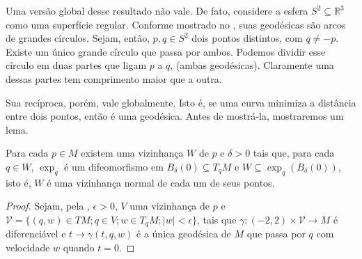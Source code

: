 Uma versão global desse resultado não vale. De fato, considere a esfera $S^{2}\subseteq \mathbb{R}^{3}$ como uma superfície regular. Conforme mostrado no , suas geodésicas são arcos de grandes círculos. Sejam, então, $p,q \in S^{2}$ dois pontos distintos, com $q\neq-p$. Existe um único grande círculo que passa por ambos. Podemos dividir esse círculo em duas partes que ligam $p$ a $q$, (ambas geodésicas). Claramente uma dessas partes tem comprimento maior que a outra.

Sua recíproca, porém, vale globalmente. Isto é, se uma curva minimiza a distância entre dois pontos, então é uma geodésica. Antes de mostrá-la, mostraremos um lema.
\begin{lemma}
    \label{lem:vizinhanca-totalmente-normal}
    Para cada $p \in M$ existem uma vizinhança $W$ de $p$ e $\delta>0$ tais que, para cada $q \in W$, $\exp_{q}$ é um difeomorfismo em $B_{\delta}(0)\subseteq T_{q}M$ e $W \subseteq \exp_{q}(B_{\delta}(0))$, isto é, $W$ é uma vizinhança normal de cada um de seus pontos.
    \begin{proof}

        Sejam, pela , $\epsilon>0$, $V$ uma vizinhança de $p$ e $\mathcal{V}=\{ (q,w)\in TM;q \in V; w\in T_{q}M; |w|<\epsilon \}$, tais que $\gamma:(-2,2)\times \mathcal{V}\to M$ é diferenciável e $t\to \gamma(t,q,w)$ é a única geodésica de $M$ que passa por $q$ com velocidade $w$ quando $t=0$.


\end{proof}
\end{lemma}

